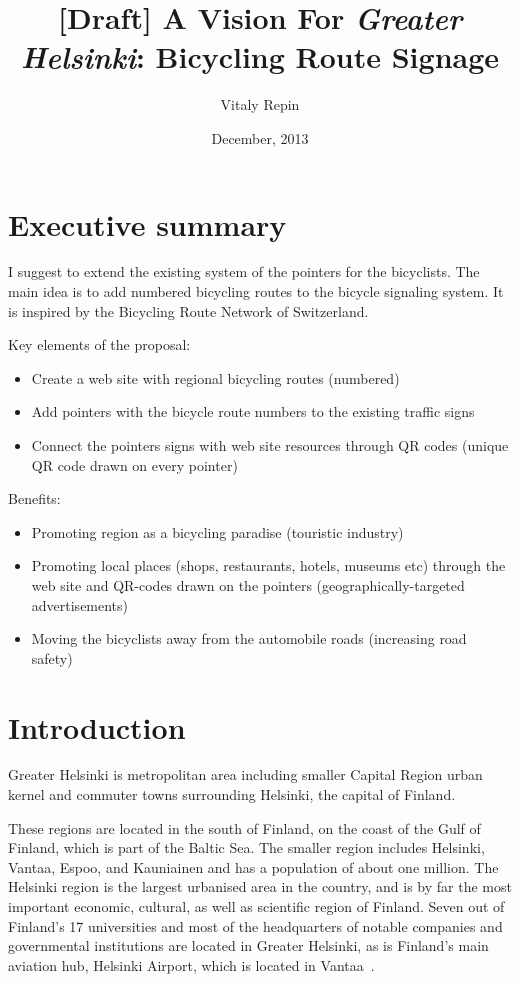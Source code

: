 \documentclass[a4paper]{article}
\author{Vitaly Repin}
\title{[Draft] A Vision For \emph{Greater Helsinki}: Bicycling Route Signage}
\date{December, 2013}
\begin{document}
\section{Executive summary}
I suggest to extend the existing system of the pointers for the bicyclists. The main idea is to add numbered bicycling routes to the bicycle signaling system.
It is inspired by the Bicycling Route Network of Switzerland.

Key elements of the proposal:

\begin{itemize}
\item Create a web site with regional bicycling routes (numbered)
\item Add pointers with the bicycle route numbers to the existing traffic signs
\item Connect the pointers signs with web site resources through QR codes (unique QR code drawn on every pointer)
\end{itemize}

Benefits:

\begin{itemize}
\item Promoting region as a bicycling paradise (touristic industry)
\item Promoting local places (shops, restaurants, hotels, museums etc) through the web site and QR-codes drawn on the pointers (geographically-targeted advertisements)
\item Moving the bicyclists away from the automobile roads (increasing road safety)
\end{itemize}

\section{Introduction}
Greater Helsinki is metropolitan area including smaller Capital Region urban kernel and commuter towns surrounding Helsinki, the capital of Finland.

These regions are located in the south of Finland, on the coast of the Gulf of Finland, which is part of the Baltic Sea. The smaller region includes Helsinki, Vantaa, Espoo, and Kauniainen and has a population of about one million. The Helsinki region is the largest urbanised area in the country, and is by far the most important economic, cultural, as well as scientific region of Finland.
Seven out of Finland's 17 universities and most of the headquarters of notable companies and governmental institutions are located in Greater Helsinki, as is Finland's main aviation hub,
Helsinki Airport, which is located in Vantaa~\cite{GHel}.
\end{document}
